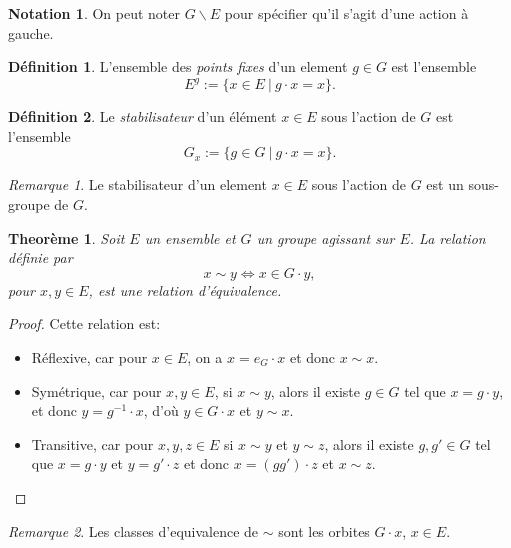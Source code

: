 \documentclass[french]{article}
\theoremstyle{plain}
\newtheorem{thm}{Theorème}[section]
\theoremstyle{remark}
\newtheorem*{rmq}{Remarque}
\theoremstyle{definition}
\newtheorem{defn}{Définition}[section]
\newtheorem*{notn}{Notation}
\begin{document}
\begin{notn}
	On peut noter $G \backslash E$ pour spécifier qu'il s'agit d'une action à gauche.
\end{notn}

\begin{defn}
	L'ensemble des \emph{points fixes} d'un element $g \in G$ est l'ensemble
	\begin{equation*}
		E^g := \{x \in E\ |\ g \cdot x = x\}.
	\end{equation*}
\end{defn}

\begin{defn}
	Le \emph{stabilisateur} d'un élément $x \in E$ sous l'action de $G$ est l'ensemble
	\begin{equation*}
		G_x := \{g \in G\ |\ g \cdot x = x\}.
	\end{equation*}
\end{defn}

\begin{rmq}
	Le stabilisateur d'un element $x \in E$ sous l'action de $G$ est un sous-groupe de $G$.	
\end{rmq}

\begin{thm}
	Soit $E$ un ensemble et $G$ un groupe agissant sur $E$. La relation définie par
	\begin{equation*}
		x \sim y \iff x \in G \cdot y,
	\end{equation*}
	pour $x, y \in E$, est une relation d'équivalence.
\end{thm}

\begin{proof}
	Cette relation est:
	\begin{itemize}
		\item Réflexive, car pour $x \in E$, on a $x = e_G \cdot x$ et donc $x \sim x$.
		\item Symétrique, car pour $x, y \in E$, si $x \sim y$,
			alors il existe $g \in G$ tel que $x = g \cdot y$, et donc $y = g^{-1} \cdot x$,
			d'où $y \in G \cdot x$ et $y \sim x$.
		\item Transitive, car pour $x, y, z \in E$ si $x \sim y$ et $y \sim z$,
			alors il existe $g,g' \in G$ tel que $x = g \cdot y$ et
			$y = g' \cdot z$ et donc $x = (g g') \cdot z$ et $x \sim z$.
	\end{itemize}
\end{proof}

\begin{rmq}
	Les classes d'equivalence de $\sim$ sont les orbites $G \cdot x$, $x \in E$.
\end{rmq}
\end{document}
